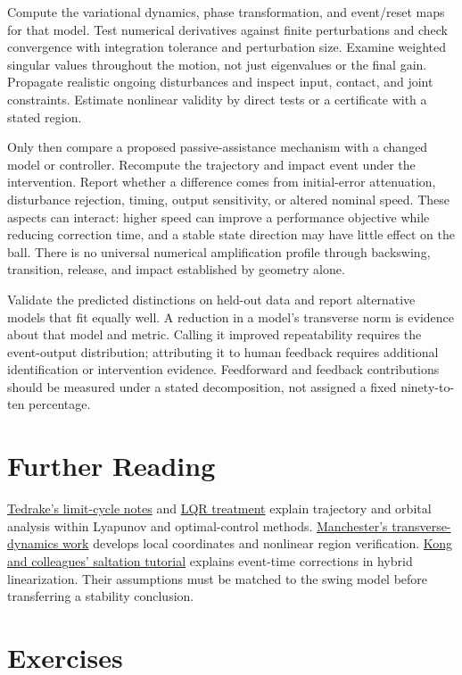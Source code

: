 \documentclass[12pt, openany]{book}
\theoremstyle{plain}
\begin{document}
Compute the variational dynamics, phase transformation, and event/reset maps
for that model. Test numerical derivatives against finite perturbations and
check convergence with integration tolerance and perturbation size. Examine
weighted singular values throughout the motion, not just eigenvalues or the
final gain. Propagate realistic ongoing disturbances and inspect input,
contact, and joint constraints. Estimate nonlinear validity by direct tests
or a certificate with a stated region.

Only then compare a proposed passive-assistance mechanism with a changed
model or controller. Recompute the trajectory and impact event under the
intervention. Report whether a difference comes from initial-error attenuation,
disturbance rejection, timing, output sensitivity, or altered nominal speed.
These aspects can interact: higher speed can improve a performance objective
while reducing correction time, and a stable state direction may have little
effect on the ball. There is no universal numerical amplification profile
through backswing, transition, release, and impact established by geometry alone.

Validate the predicted distinctions on held-out data and report alternative
models that fit equally well. A reduction in a model's transverse norm is
evidence about that model and metric. Calling it improved repeatability requires
the event-output distribution; attributing it to human feedback requires
additional identification or intervention evidence. Feedforward and feedback
contributions should be measured under a stated decomposition, not assigned
a fixed ninety-to-ten percentage.

\section{Further Reading}

\href{https://underactuated.mit.edu/limit_cycles.html}{Tedrake's limit-cycle
notes} and \href{https://underactuated.mit.edu/lqr.html}{LQR treatment} explain
trajectory and orbital analysis within Lyapunov and optimal-control methods.
\href{https://arxiv.org/abs/1010.2241}{Manchester's transverse-dynamics work}
develops local coordinates and nonlinear region verification.
\href{https://arxiv.org/abs/2306.06862}{Kong and colleagues' saltation tutorial}
explains event-time corrections in hybrid linearization. Their assumptions
must be matched to the swing model before transferring a stability conclusion.

\section{Exercises}
\end{document}
